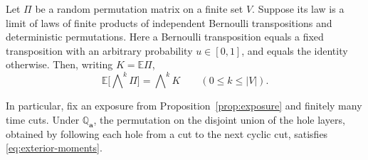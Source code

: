 \begin{lemma}
\label{lem:exterior}
Let \(\Pi\) be a random permutation matrix on a finite set \(V\).  Suppose
its law is a limit of laws of finite products of independent Bernoulli
transpositions and deterministic permutations.  Here a Bernoulli
transposition equals a fixed transposition with an arbitrary probability
\(u\in[0,1]\), and equals the identity otherwise.  Then, writing
\(K=\mathbb E\Pi\),
\begin{equation}
 \mathbb E\bigl[\bigwedge\nolimits^k\Pi\bigr]
              =\bigwedge\nolimits^k K
       \qquad (0\le k\le |V|).
 \label{eq:exterior-moments}
\end{equation}

In particular, fix an exposure from Proposition~\ref{prop:exposure}
and finitely many time cuts.  Under \(\mathbb Q_{\mathbf a}\), the
permutation on the disjoint union of the hole layers, obtained by
following each hole from a cut to the next cyclic cut, satisfies
\eqref{eq:exterior-moments}.
\end{lemma}

